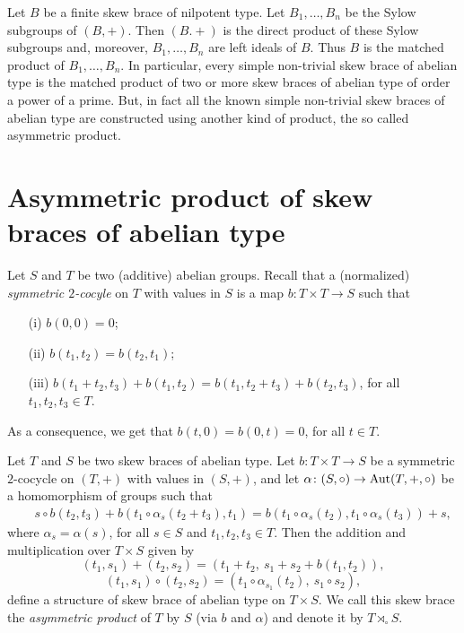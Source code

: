 Let $B$ be a finite skew brace of nilpotent type. Let $B_1,\dots ,B_n$ be the Sylow subgroups of $(B,+)$. Then $(B.+)$ is the direct product of these Sylow subgroups and, moreover, $B_1,\dots ,B_n$ are left ideals of $B$. Thus $B$ is the matched product of $B_1,\dots ,B_n$. In particular, every simple non-trivial skew brace of abelian type is the matched product of two or more skew braces of abelian type of order a power of a prime. But, in fact all the known simple non-trivial skew braces of abelian type are constructed using another kind of product, the so called asymmetric product.

\section{Asymmetric product of skew braces of abelian type}

Let $S$ and $T$ be two (additive) abelian groups. Recall that a (normalized)
\emph{symmetric $2$-cocyle}  on $T$ with values in $S$ is a map $b\colon
T\times T\to  S$ such that
\begin{enumerate}
	\item[(i)] $b(0,0)=0$;
	\item[(ii)] $b(t_1,t_2)=b(t_2,t_1)$;
	\item[(iii)] $b(t_1+t_2,t_3)+b(t_1,t_2)=b(t_1,t_2+t_3)+b(t_2,t_3)$, for all $t_1,t_2,t_3\in T$.
\end{enumerate}
As a consequence, we get that $b(t,0)=b(0,t)=0$, for all $t\in T$.

\begin{theorem}\label{ccs}
	Let $T$ and $S$ be two skew braces of abelian type. Let $b \colon T\times T
	\to S$ be a symmetric $2$-cocycle on $(T, +)$ with
	values in $(S, +)$, and let $\alpha \colon (S,\circ)\to \operatorname{Aut}(T,+,\circ)$ be a homomorphism of groups such that
	\begin{eqnarray}\label{cond3} && s\circ b(t_2, t_3) + b(t_1\circ \alpha_s(t_2 + t_3),t_1)=
		b(t_1\circ\alpha_s(t_2), t_1\circ\alpha_s(t_3))+ s,\end{eqnarray}
	where $\alpha_s=\alpha(s)$, for all $s\in S$ and $t_1, t_2, t_3\in T$. Then the addition and
	multiplication over $T\times S$ given by
	$$
	(t_1,s_1)+(t_2,s_2)=(t_1+t_2,~s_1+s_2+b(t_1,t_2)),
	$$
	$$
	(t_1,s_1)\circ (t_2,s_2)=(t_1\circ \alpha_{s_1}(t_2),~s_1\circ s_2),
	$$
	define a structure of skew brace of abelian type on $T\times S$. We call this skew
	brace the \emph{asymmetric product}  of $T$ by $S$ (via $b$ and $\alpha$)
	and denote it by  $T\rtimes_\circ S$.
\end{theorem}

